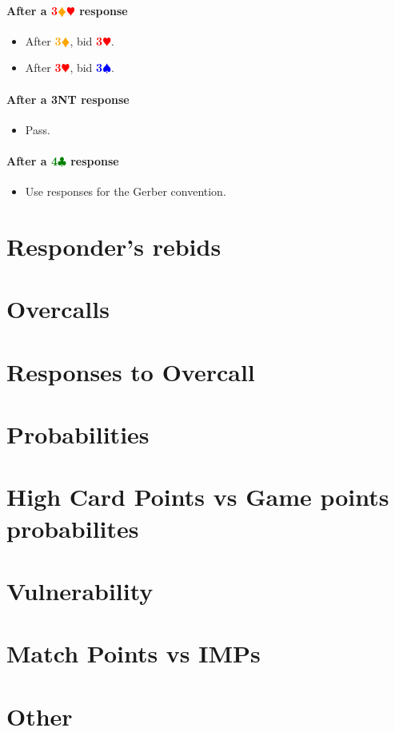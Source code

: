 \documentclass{article}
\newcommand{\Hs}{\textcolor{Red}{$\varheart$}}
\newcommand{\Ss}{\textcolor{Blue}{$\spadesuit$}}
\newcommand{\Ds}{\textcolor{Orange}{$\vardiamond$}}
\newcommand{\Cs}{\textcolor{Green}{$\clubsuit$}}
\newcommand{\NTs}{\textbf{\footnotesize{NT}}}
\renewcommand{\H}[1]{\textcolor{Red}{\textbf{#1}\Hs}}
\renewcommand{\S}[1]{\textcolor{Blue}{\textbf{#1}\Ss}}
\newcommand{\D}[1]{\textcolor{Orange}{\textbf{#1}\Ds}}
\newcommand{\C}[1]{\textcolor{Green}{\textbf{#1}\Cs}}
\newcommand{\NT}[1]{\textbf{#1\NTs}}
\newcommand{\reds}[1]{\textcolor{Red}{\textbf{#1}}\Ds\Hs}
\begin{document}
\paragraph{After a \reds{3} response}

\begin{itemize}
\item After \D{3}, bid \H{3}.
\item After \H{3}, bid \S{3}.
\end{itemize}

\paragraph{After a \NT{3} response}

\begin{itemize}
\item Pass.
\end{itemize}

\paragraph{After a \C{4} response}

\begin{itemize}
\item Use responses for the Gerber convention.
\end{itemize}

\section{Responder's rebids}


\section{Overcalls}
\section{Responses to Overcall}

\section{Probabilities}
\section{High Card Points vs Game points probabilites}
\section{Vulnerability}
\section{Match Points vs IMPs}
\section{Other}
\end{document}
